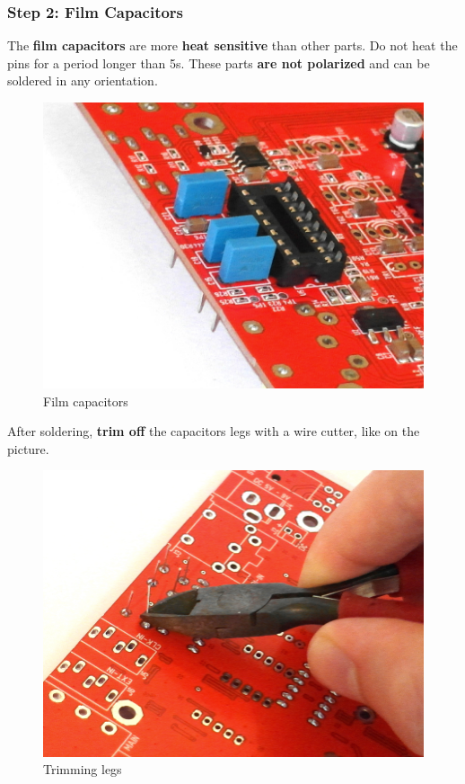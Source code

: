 \documentclass{scrartcl}
\begin{document}
\pagebreak
\subsubsection{Step 2: Film Capacitors}

The \textbf{film capacitors} are more \textbf{heat sensitive} than other parts. Do not heat the pins for a period longer than 5s.
These parts \textbf{are not polarized} and can be soldered in any orientation.

\begin{figure}[!ht]
    \begin{center}
        \includegraphics[scale=0.24]{assets/pcb-caps.jpg}
        \caption{Film capacitors}
    \end{center}
\end{figure}

After soldering, \textbf{trim off} the capacitors legs with a wire cutter, like on the picture.

\begin{figure}[!ht]
    \begin{center}
        \includegraphics[scale=0.24]{assets/pcb-legs.jpg}
        \caption{Trimming legs}
    \end{center}
\end{figure}
\end{document}
